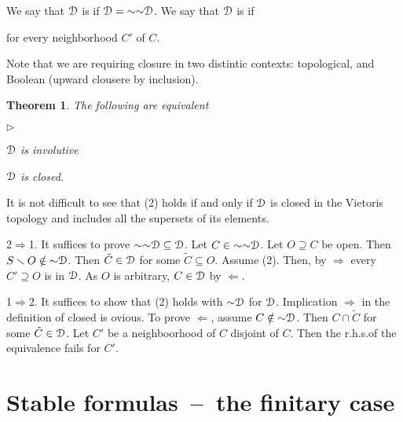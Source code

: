 \documentclass{amsproc}
\makeatletter
\newcommand{\mylabel}[1]{{#1}\hfill}
\renewenvironment{itemize}
  {\begin{list}{$\triangleright$}{%
  \setlength{\parskip}{0mm}
  \setlength{\topsep}{.1\baselineskip}
  \setlength{\rightmargin}{0mm}
  \setlength{\listparindent}{0mm}
  \setlength{\itemindent}{0mm}
  \setlength{\labelwidth}{3ex}
  \setlength{\itemsep}{.1\baselineskip}
  \setlength{\parsep}{.1\baselineskip}
  \setlength{\partopsep}{0mm}
  \setlength{\labelsep}{1ex}
  \setlength{\leftmargin}{\labelwidth+\labelsep}
  \let\makelabel\mylabel}}{%
\end{list}}
\newcounter{thm}
\theoremstyle{mio}
\newtheorem{theorem}[thm]{Theorem}\tcolorboxenvironment{theorem}{mythm}
\providecommand{\proofNameStyle}{\bfseries}
\renewenvironment{proof}[1][\proofname]{\par
  \pushQED{\qed}%
  \normalfont%
  \trivlist
  \item[\hskip\labelsep
        \proofNameStyle
    #1\@addpunct{.}]\ignorespaces
}{%
  \popQED\endtrivlist\@endpefalse
}
\renewcommand*{\emph}[1]{%
   \smash{\tikz[baseline]\node[rectangle, fill=teal!25, rounded corners, inner xsep=0.5ex, inner ysep=0.2ex, anchor=base, minimum height = 2.7ex]{\strut #1};}}
\makeatother
\begin{document}
We say that ${\EuScript D}$ is \emph{involutive\/} if ${\EuScript D}={\sim}{\sim}{\EuScript D}$.
We say that ${\EuScript D}$ is \emph{closed\/} if 

 for every neighborhood $C'$ of $C$.

Note that we are requiring closure in two distintic contexts: topological, and Boolean (upward clousere by inclusion).

\begin{theorem}
  The following are equivalent
  \begin{itemize}
    \item [1.] ${\EuScript D}$ is involutive 
    \item [2.] ${\EuScript D}$ is closed.
  \end{itemize}
\end{theorem}

\noindent\llap{\textcolor{red}{\Large\warning}\kern1.5ex}\ignorespaces
It is not difficult to see that (2) holds if and only if ${\EuScript D}$ is closed in the Vietoris topology and includes all the supersets of its elements.

\begin{proof}
  2$\Rightarrow$1.
  It suffices to prove ${\sim}{\sim}{\EuScript D}\subseteq{\EuScript D}$.
  Let $C\in{\sim}{\sim}{\EuScript D}$.
  Let $O\supseteq C$ be open.
  Then $S\smallsetminus O\notin{\sim}{\EuScript D}$.
  Then $\tilde C\in{\EuScript D}$ for some $\tilde C\subseteq O$.
  Assume (2).
  Then, by $\Rightarrow$ every $C'\supseteq O$ is in ${\EuScript D}$.
  As $O$ is arbitrary, $C\in {\EuScript D}$ by $\Leftarrow$.

  1$\Rightarrow$2.
  It suffices to show that (2) holds with ${\sim}{\EuScript D}$ for ${\EuScript D}$.
  Implication $\Rightarrow$ in the definition of closed is ovious.
  To prove $\Leftarrow$, assume $C\notin{\sim}{\EuScript D}$.
  Then $C\cap\tilde C$ for some $\tilde C\in{\EuScript D}$.
  Let $C'$ be a neighboorhood of $C$ disjoint of $C$.
  Then the r.h.s.\@ of the equivalence fails for $C'$.  
\end{proof}


\section{Stable formulas~--~the finitary case}
\def\medrel#1{\parbox{5ex}{\hfil $#1$}}
\def\ceq#1#2#3{\parbox[t]{22ex}{$\displaystyle #1$}\medrel{#2}{$\displaystyle #3$}}
\end{document}
